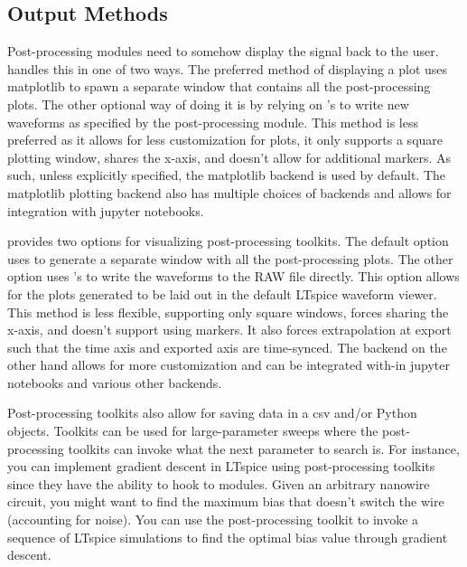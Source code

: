 
\subsection{Output Methods}

Post-processing modules need to somehow display the signal back to the user.  handles this
in one of two ways. The preferred method of displaying a plot uses matplotlib to spawn a separate window
that contains all the post-processing plots. The other optional way of doing it is by relying on 
's  to write new waveforms as specified by the post-processing module.
This method is less preferred as it allows for less customization for plots, it only supports a square
plotting window, shares the x-axis, and doesn't allow for additional markers. As such, unless explicitly
specified, the matplotlib backend is used by default. The matplotlib plotting backend also has multiple 
choices of backends and allows for integration with jupyter notebooks. 

 provides two options for visualizing post-processing toolkits. The default
option uses  to generate a separate window with all the post-processing
plots. The other option uses 's  to write the waveforms
to the RAW file directly. This option allows for the plots generated to be laid out in the
default LTspice waveform viewer. This method is less flexible, supporting only square 
windows, forces sharing the x-axis, and doesn't support using markers. It also forces
extrapolation at export such that the time axis and exported axis are time-synced.
The  backend on the other hand allows for more customization and 
can be integrated with-in jupyter notebooks and various other  backends.

Post-processing toolkits also allow for saving data in a csv and/or Python objects. 
Toolkits can be used for large-parameter sweeps where the post-processing toolkits
can invoke what the next parameter to search is. For instance, you can implement
gradient descent in LTspice using post-processing toolkits since they have the ability
to hook to modules. Given an arbitrary nanowire circuit, you might want to find the
maximum bias that doesn't switch the wire (accounting for noise). You can use 
the post-processing toolkit to invoke a sequence of LTspice simulations to find
the optimal bias value through gradient descent.

